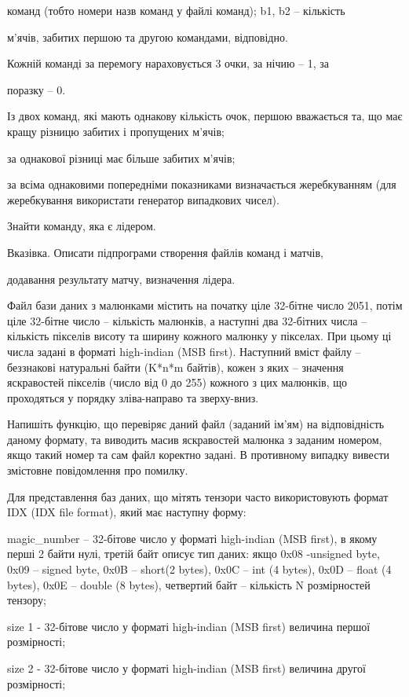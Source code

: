 \documentclass[]{article}
\begin{document}
команд (тобто номери назв команд у файлі команд); b1, b2 -- кількість

м'ячів, забитих першою та другою командами, відповідно.

Кожній команді за перемогу нараховується 3 очки, за нічию -- 1, за

поразку -- 0.

Із двох команд, які мають однакову кількість очок, першою вважається та,
що має кращу різницю забитих і пропущених м'ячів;

за однакової різниці має більше забитих м'ячів;

за всіма однаковими попередніми показниками визначається жеребкуванням
(для жеребкування використати генератор випадкових чисел).

Знайти команду, яка є лідером.

Вказівка. Описати підпрограми створення файлів команд і матчів,

додавання результату матчу, визначення лідера.

Файл бази даних з малюнками містить на початку ціле 32-бітне число 2051,
потім ціле 32-бітне число -- кількість малюнків, а наступні два
32-бітних числа -- кількість пікселів висоту та ширину кожного малюнку у
пікселах. При цьому ці числа задані в форматі high-indian (MSB first).
Наступний вміст файлу -- беззнакові натуральні байти (K*n*m байтів),
кожен з яких -- значення яскравостей пікселів (число від 0 до 255)
кожного з цих малюнків, що проходяться у порядку зліва-направо та
зверху-вниз.

Напишіть функцію, що перевіряє даний файл (заданий ім'ям) на
відповідність даному формату, та виводить масив яскравостей малюнка з
заданим номером, якщо такий номер та сам файл коректно задані. В
противному випадку вивести змістовне повідомлення про помилку.

Для представлення баз даних, що мітять тензори часто використовують
формат IDX (IDX file format), який має наступну форму:

magic\_number -- 32-бітове число у форматі high-indian (MSB first), в
якому перші 2 байти нулі, третій байт описує тип даних: якщо 0x08
-unsigned byte, 0x09 -- signed byte, 0x0B -- short(2 bytes), 0x0C -- int
(4 bytes), 0x0D -- float (4 bytes), 0x0E -- double (8 bytes), четвертий
байт -- кількість N розмірностей тензору;

size 1 - 32-бітове число у форматі high-indian (MSB first) величина
першої розмірності;

size 2 - 32-бітове число у форматі high-indian (MSB first) величина
другої розмірності;
\end{document}
